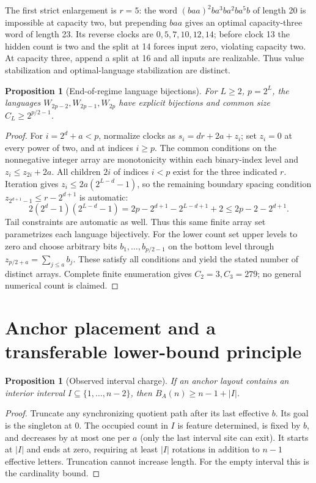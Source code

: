 \documentclass[11pt]{article}
\newtheorem{proposition}[theorem]{Proposition}
\begin{document}
The first strict enlargement is $r=5$: the word
$(baa)^2ba^3ba^2ba^5b$ of length 20 is impossible at capacity two, but
prepending $baa$ gives an optimal capacity-three word of length 23.
Its reverse clocks are $0,5,7,10,12,14$; before clock 13 the hidden count
is two and the split at 14 forces input zero, violating capacity two.
At capacity three, append a split at 16 and all inputs are realizable.
Thus value stabilization and optimal-language stabilization are distinct.

\begin{proposition}[End-of-regime language bijections]
For $L\ge2$, $p=2^L$, the languages $W_{2p-2},W_{2p-1},W_{2p}$ have
explicit bijections and common size $C_L\ge2^{p/2-1}$.
\end{proposition}
\begin{proof}
For $i=2^d+a<p$, normalize clocks as
$s_i=dr+2a+z_i$; set $z_i=0$ at every power of two, and at indices
$i\ge p$. The common conditions on the nonnegative integer array are
monotonicity within each binary-index level and
$z_i\le z_{2i}+2a$. All children $2i$ of indices $i<p$ exist for the
three indicated $r$. Iteration gives
$z_i\le2a(2^{L-d}-1)$, so the remaining boundary spacing condition
$z_{2^{d+1}-1}\le r-2^{d+1}$ is automatic:
\[
2(2^d-1)(2^{L-d}-1)
=2p-2^{d+1}-2^{L-d+1}+2\le2p-2-2^{d+1}.
\]
Tail constraints are automatic as well. Thus this same finite array set
parametrizes each language bijectively. For the lower count set upper
levels to zero and choose arbitrary bits $b_1,\ldots,b_{p/2-1}$ on the
bottom level through $z_{p/2+a}=\sum_{j\le a}b_j$. These satisfy all
conditions and yield the stated number of distinct arrays. Complete finite
enumeration gives $C_2=3,C_3=279$; no general numerical count is claimed.
\end{proof}

\section{Anchor placement and a transferable lower-bound principle}
\begin{proposition}[Observed interval charge]
If an anchor layout contains an interior interval $I\subseteq\{1,\ldots,n-2\}$,
then $B_A(n)\ge n-1+|I|$.
\end{proposition}
\begin{proof}
Truncate any synchronizing quotient path after its last effective $b$.
Its goal is the singleton at $0$. The occupied count in $I$ is feature
determined, is fixed by $b$, and decreases by at most one per $a$ (only the
last interval site can exit). It starts at $|I|$ and ends at zero, requiring
at least $|I|$ rotations in addition to $n-1$ effective letters. Truncation
cannot increase length. For the empty interval this is the cardinality bound.
\end{proof}
\end{document}
